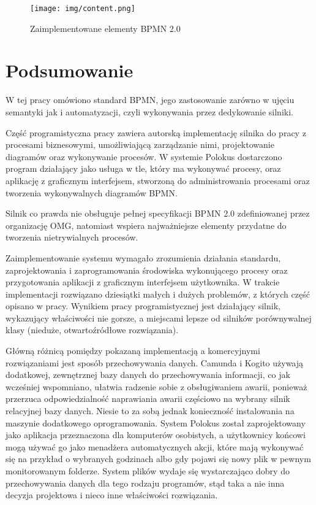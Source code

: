 \documentclass[declaration,shortabstract,mgr]{iithesis}
\newcommand{\bpmn}{BPMN }
\newcommand{\bpmnnospace}{BPMN}
\begin{document}
\newpage
\begin{figure}[H]
    \texttt{[image: img/content.png]}
    \caption{Zaimplementowane elementy \bpmn 2.0}
    \label{fig:features}
\end{figure}

\chapter{Podsumowanie}
W tej pracy omówiono standard \bpmnnospace, jego zastosowanie zarówno w ujęciu semantyki jak i automatyzacji, czyli wykonywania przez dedykowanie silniki. 

Część programistyczna pracy zawiera autorską implementację silnika do pracy z procesami biznesowymi, umożliwiającą zarządzanie nimi, projektowanie diagramów oraz wykonywanie procesów. W systemie Polokus dostarczono program działający jako usługa w tle, który ma wykonywać procesy, oraz aplikację z graficznym interfejsem, stworzoną do administrowania procesami oraz tworzenia wykonywalnych diagramów \bpmnnospace. 

Silnik co prawda nie obsługuje pełnej specyfikacji \bpmn 2.0 zdefiniowanej przez organizację OMG, natomiast wspiera najważniejsze elementy przydatne do tworzenia nietrywialnych procesów.

Zaimplementowanie systemu wymagało zrozumienia działania standardu, zaprojektowania i zaprogramowania środowiska wykonującego procesy oraz przygotowania aplikacji z graficznym interfejsem użytkownika. W trakcie implementacji rozwiązano dziesiątki małych i dużych problemów, z których część opisano w pracy. Wynikiem pracy programistycznej jest działający silnik, wykazujący właściwości nie gorsze, a miejscami lepsze od silników porównywalnej klasy (nieduże, otwartoźródłowe rozwiązania).

Główną różnicą pomiędzy pokazaną implementacją a komercyjnymi rozwiązaniami jest sposób przechowywania danych. Camunda i Kogito używają dodatkowej, zewnętrznej bazy danych do przechowywania informacji, co jak wcześniej wspomniano, ułatwia radzenie sobie z obsługiwaniem awarii, ponieważ przerzuca odpowiedzialność naprawiania awarii częściowo na wybrany silnik relacyjnej bazy danych. Niesie to za sobą jednak konieczność instalowania na maszynie dodatkowego oprogramowania. System Polokus został zaprojektowany jako aplikacja przeznaczona dla komputerów osobistych, a użytkownicy końcowi mogą używać go jako menadżera automatycznych akcji, które mają wykonywać się na przykład o wybranych godzinach albo gdy pojawi się nowy plik w pewnym monitorowanym folderze. System plików wydaje się wystarczająco dobry do przechowywania danych dla tego rodzaju programów, stąd taka a nie inna decyzja projektowa i nieco inne właściwości rozwiązania.
\end{document}

